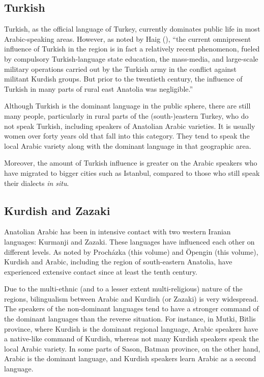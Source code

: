 \documentclass[output=paper]{langsci/langscibook}
\begin{document}
\subsection{Turkish}
Turkish, as the official language of Turkey, currently dominates public life in most Arabic-speaking areas. However, as noted by Haig (\citeyear[14]{Haig2014}), ``the current omnipresent influence of Turkish in the region is in fact a relatively recent phenomenon,
fueled by compulsory Turkish-language state education, the mass-media, and large-scale military operations carried out by the Turkish army in the conflict against militant Kurdish groups. But prior to the twentieth century, the influence of Turkish in many parts of rural east Anatolia was negligible.''

Although Turkish is the dominant language in the public sphere, there are still many people, particularly in rural parts of the (south-)eastern Turkey, who do not speak Turkish, including speakers of Anatolian Arabic varieties. It is usually women over forty years old that fall into this category. They tend to speak the local Arabic variety along with the dominant language in that geographic area. 

Moreover, the amount of Turkish influence is greater on the Arabic speakers who have migrated to bigger cities such as Istanbul, compared to those who still speak their dialects \textit{in situ}.

\subsection{Kurdish and Zazaki}
Anatolian Arabic has been in intensive contact with two western Iranian languages: Kurmanji and Zazaki. These languages have influenced each other on different levels. As noted by Proch\'{a}zka (this volume) and Öpengin (this volume), Kurdish and Arabic, including the region of south-eastern Anatolia, have experienced extensive contact since at least the tenth century.


Due to the multi-ethnic (and to a lesser extent multi-religious) nature of the regions, bilingualism between Arabic and Kurdish (or Zazaki) is very widespread. The speakers of the non-dominant languages tend to have a stronger command of the dominant languages than the reverse situation. For instance, in Mutki, Bitlis province, where Kurdish is the dominant regional language, Arabic speakers have a native-like command of Kurdish, whereas not many Kurdish speakers speak the local Arabic variety. In some parts of Sason, Batman province, on the other hand, Arabic is the dominant language, and Kurdish speakers learn Arabic as a second language. 
\end{document}
